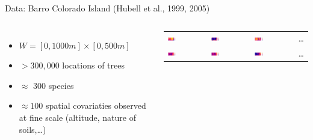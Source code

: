 \documentclass[serif]{beamer}
\begin{document}
\begin{frame}{Data: Barro Colorado Island (Hubell et al., 1999, 2005)}

\begin{columns}
\column{6cm}
\begin{itemize}
	\item $W=[0,1000m]\times[0,500m]$
	\item $>300,\!000$ locations of trees
	\item $\approx$ 300 species
	\item $\approx 100$ spatial covariaties observed at fine scale (altitude, nature of soils,\dots)
\end{itemize}
\column{6cm}
	\begin{tabular}{llll}
				\includegraphics[width=0.23\textwidth]{covar1sim3.jpg} & \includegraphics[width=0.23\textwidth]{covar2sim3.jpg} &  \includegraphics[width=0.23\textwidth]{covar3sim3.jpg} 
			&\dots\\	%
				\includegraphics[width=0.23\textwidth]{covar6sim3.jpg} & \includegraphics[width=0.23\textwidth]{covar7sim3.jpg} & \includegraphics[width=0.23\textwidth]{covar8sim3.jpg}&\dots \\

\end{tabular}
\end{columns}
\end{frame}
\end{document}

